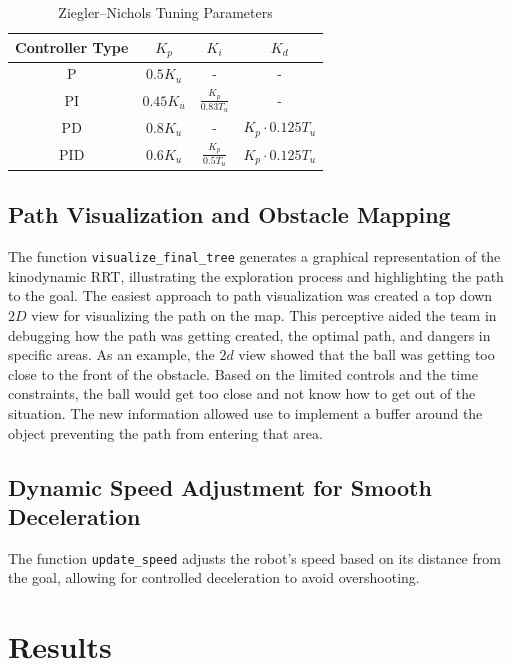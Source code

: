 \documentclass[12pt]{article}
\begin{document}
\begin{table}[h!]
    \centering
    \begin{tabular}{|c|c|c|c|}
        \hline
        \textbf{Controller Type} & \( K_p \) & \( K_i \) & \( K_d \) \\
        \hline
        P & \( 0.5 K_u \) & - & - \\
        PI & \( 0.45 K_u \) & \( \frac{K_p}{0.83 T_u} \) & - \\
        PD & \( 0.8 K_u \) & - & \( K_p \cdot 0.125 T_u \) \\
        PID & \( 0.6 K_u \) & \( \frac{K_p}{0.5 T_u} \) & \( K_p \cdot 0.125 T_u \) \\
        \hline
    \end{tabular}
    \caption{Ziegler–Nichols Tuning Parameters}
    \label{tab:zn_parameters}
\end{table}

\subsection{Path Visualization and Obstacle Mapping}
The function \texttt{visualize\_final\_tree} generates a graphical representation of the kinodynamic RRT, illustrating the exploration process and highlighting the path to the goal. The easiest approach to path visualization was created a top down $2D$ view for visualizing the path on the map. This perceptive aided the team in debugging how the path was getting created, the optimal path, and dangers in specific areas. As an example, the $2d$ view showed that the ball was getting too close to the front of the obstacle. Based on the limited controls and the time constraints, the ball would get too close and not know how to get out of the situation. The new information allowed use to implement a buffer around the object preventing the path from entering that area. 

\subsection{Dynamic Speed Adjustment for Smooth Deceleration}
The function \texttt{update\_speed} adjusts the robot's speed based on its distance from the goal, allowing for controlled deceleration to avoid overshooting.

\section{Results}
\end{document}
